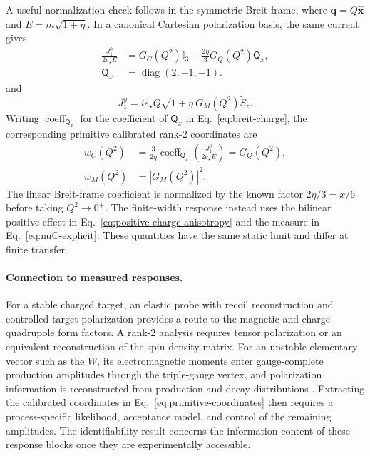 \documentclass[12pt]{iopjournal}
\newcommand{\diag}{\operatorname{diag}}
\theoremstyle{definition}
\theoremstyle{remark}
\begin{document}
A useful normalization check follows in the symmetric Breit frame, where $\bm q=Q\hat{\bm x}$ and $E=m\sqrt{1+\eta}$. In a canonical Cartesian polarization basis, the same current gives
\begin{align}
\frac{J_1^0}{2e_\star E}
&=G_C(Q^2)\mathbb I_3
+\frac{2\eta}{3}G_Q(Q^2)\mathsf Q_x,
\nonumber\\
\mathsf Q_x&=\diag(2,-1,-1).
\label{eq:breit-charge}
\end{align}
and
\begin{equation}
J_1^y=i e_\star Q\sqrt{1+\eta}\,G_M(Q^2)\widetilde S_z.
\label{eq:breit-magnetic}
\end{equation}
Writing $\operatorname{coeff}_{\mathsf Q_x}$ for the coefficient of $\mathsf Q_x$ in Eq.~\eqref{eq:breit-charge}, the corresponding primitive calibrated rank-$2$ coordinates are
\begin{equation}
\boxed{
\begin{aligned}
w_C(Q^2)&=\frac{3}{2\eta}
\operatorname{coeff}_{\mathsf Q_x}\!\left(\frac{J_1^0}{2e_\star E}\right)
=G_Q(Q^2),\\
w_M(Q^2)&=|G_M(Q^2)|^2.
\end{aligned}
}
\label{eq:primitive-coordinates}
\end{equation}
The linear Breit-frame coefficient is normalized by the known factor $2\eta/3=x/6$ before taking $Q^2\to0^+$. The finite-width response instead uses the bilinear positive effect in Eq.~\eqref{eq:positive-charge-anisotropy} and the measure in Eq.~\eqref{eq:nuC-explicit}. These quantities have the same static limit and differ at finite transfer.

\paragraph{Connection to measured responses.}
For a stable charged target, an elastic probe with recoil reconstruction and controlled target polarization provides a route to the magnetic and charge-quadrupole form factors. A rank-$2$ analysis requires tensor polarization or an equivalent reconstruction of the spin density matrix. For an unstable elementary vector such as the $W$, its electromagnetic moments enter gauge-complete production amplitudes through the triple-gauge vertex, and polarization information is reconstructed from production and decay distributions \cite{HagiwaraPecceiZeppenfeldHikasa1987,BurnsKongMatchevPark2008,GaoEtAl2010,BolognesiEtAl2012,ChoiChristensenSalmonWang2015}. Extracting the calibrated coordinates in Eq.~\eqref{eq:primitive-coordinates} then requires a process-specific likelihood, acceptance model, and control of the remaining amplitudes. The identifiability result concerns the information content of these response blocks once they are experimentally accessible.
\end{document}
